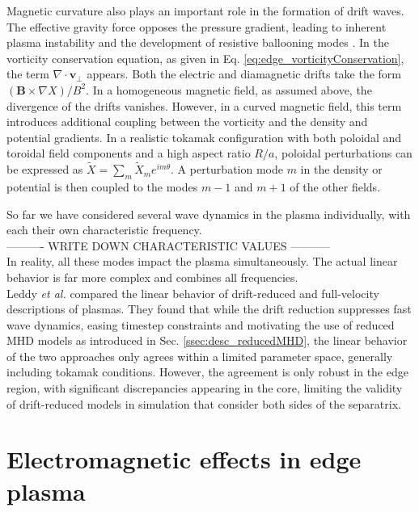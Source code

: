 Magnetic curvature also plays an important role in the formation of drift waves. The effective gravity force opposes the pressure gradient, leading to inherent plasma instability and the development of resistive ballooning modes \cite{hastie2003drift}. In the vorticity conservation equation, as given in Eq. \ref{eq:edge_vorticityConservation}, the term $ \nabla \cdot \mathbf{v}_\perp $ appears. Both the electric and diamagnetic drifts take the form $ ( \mathbf{B} \times \nabla X)/B^2 $. In a homogeneous magnetic field, as assumed above, the divergence of the drifts vanishes. However, in a curved magnetic field, this term introduces additional coupling between the vorticity and the density and potential gradients. In a realistic tokamak configuration with both poloidal and toroidal field components and a high aspect ratio $ R/a $, poloidal perturbations can be expressed as $ \tilde{X} = \sum_m \tilde{X}_m e^{im\theta} $. A perturbation mode $ m $ in the density or potential is then coupled to the modes $ m-1 $ and $ m+1 $ of the other fields. \newline 


So far we have considered several wave dynamics in the plasma individually, with each their own characteristic frequency.  \\
---------- WRITE DOWN CHARACTERISTIC VALUES -----------  \\
In reality, all these modes impact the plasma simultaneously. The actual linear behavior is far more complex and combines all frequencies. \\

Leddy \emph{\emph{et al.}}\cite{leddy2015validity} compared the linear behavior of drift-reduced and full-velocity descriptions of plasmas. They found that while the drift reduction suppresses fast wave dynamics, easing timestep constraints and motivating the use of reduced MHD models as introduced in Sec. \ref{ssec:desc_reducedMHD}, the linear behavior of the two approaches only agrees within a limited parameter space, generally including tokamak conditions. However, the agreement is only robust in the edge region, with significant discrepancies appearing in the core, limiting the validity of drift-reduced models in simulation that consider both sides of the separatrix.




\section{Electromagnetic effects in edge plasma}
\label{sec:edge_EMeffects}

